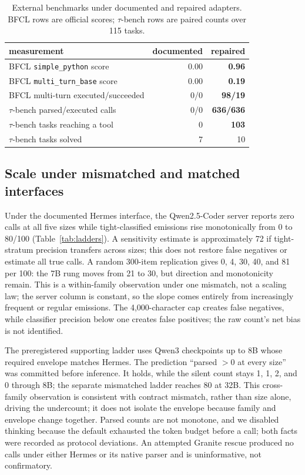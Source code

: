 \begin{table}[H]
\caption{External benchmarks under documented and repaired adapters. BFCL rows are official
scores; $\tau$-bench rows are paired counts over 115 tasks.}
\label{tab:external_main}
\centering
\small
\begin{tabular}{lrr}
\toprule
measurement & documented & repaired \\
\midrule
BFCL \texttt{simple\_python} score & 0.00 & \textbf{0.96} \\
BFCL \texttt{multi\_turn\_base} score & 0.00 & \textbf{0.19} \\
BFCL multi-turn executed/succeeded & 0/0 & \textbf{98/19} \\
\midrule
$\tau$-bench parsed/executed calls & 0/0 & \textbf{636/636} \\
$\tau$-bench tasks reaching a tool & 0 & \textbf{103} \\
$\tau$-bench tasks solved & 7 & 10 \\
\bottomrule
\end{tabular}
\end{table}

\subsection{Scale under mismatched and matched interfaces}
\label{sec:scale}

Under the documented Hermes interface, the Qwen2.5-Coder server reports zero calls at all five
sizes while tight-classified emissions rise monotonically from 0 to 80/100
(Table~\ref{tab:ladders}). A sensitivity estimate is approximately 72 if tight-stratum
precision transfers across sizes; this does not restore false negatives or estimate all true calls. A random 300-item
replication gives 0, 4, 30, 40, and 81 per 100: the 7B rung moves from 21 to 30, but direction and
monotonicity remain. This is a within-family observation under one mismatch, not a scaling law;
the server column is constant, so the slope comes entirely from increasingly frequent or regular
emissions. The 4,000-character cap creates false negatives, while classifier precision below one
creates false positives; the raw count's net bias is not identified.

The preregistered supporting ladder uses Qwen3 checkpoints up to 8B whose required envelope matches Hermes.
The prediction ``parsed $>0$ at every size'' was committed before inference. It holds, while the
silent count stays 1, 1, 2, and 0 through 8B; the separate mismatched ladder reaches 80 at
32B. This cross-family observation is
consistent with contract mismatch, rather than size alone, driving the undercount; it does not
isolate the envelope because family and envelope change together. Parsed counts are not monotone, and we disabled thinking because the
default exhausted the token budget before a call; both facts were recorded as protocol deviations.
An attempted Granite rescue produced no calls under either Hermes or its native parser and is
uninformative, not confirmatory.

